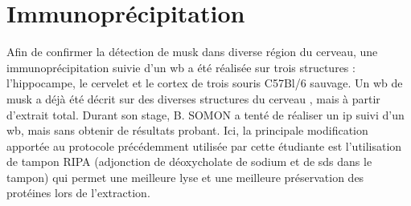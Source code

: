 \section{Immunoprécipitation}
\label{sec:IPresultat}
	Afin de confirmer la détection de \gls{musk} dans diverse région du cerveau, une immunoprécipitation suivie d'un \gls{wb} a été réalisée sur trois structures : l'hippocampe, le cervelet et le cortex de trois souris C57Bl/6 sauvage. Un \gls{wb} de \gls{musk} a déjà été décrit sur des diverses structures du cerveau \cite{Garcia-Osta2006}, mais à partir d'extrait total. Durant son stage, B. SOMON a tenté de réaliser un \gls{ip} suivi d'un \gls{wb}, mais sans obtenir de résultats probant. Ici, la principale modification apportée au protocole précédemment utilisée par cette étudiante est l'utilisation de tampon RIPA (adjonction de déoxycholate de sodium et de \acrshort{sds} dans le tampon) qui permet une meilleure lyse et une meilleure préservation des protéines lors de l'extraction.
	
